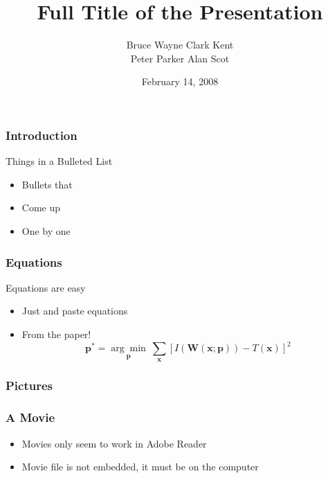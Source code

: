\documentclass[serif,mathserif]{beamer}
\author[Bruce Wayne]{Bruce Wayne \quad Clark Kent\\Peter Parker \quad Alan Scot}
\title[Short Title\hspace{2em}\insertframenumber/\inserttotalframenumber]{Full Title of the Presentation}
\date{February 14, 2008} %
\institute{Justice League of America}
\begin{document}
\maketitle


\begin{frame}
  \frametitle{Introduction}
  Things in a Bulleted List\pause
  \begin{itemize}
  \item Bullets that\pause
  \item Come up\pause
  \item One by one %
  \end{itemize}
\end{frame}


\begin{frame}
  \frametitle{Equations}
  Equations are easy
  \begin{itemize}
  \item Just and paste equations\pause
  \item From the paper!
    \begin{equation*}
      \textbf{p}^* = \underset{\textbf{p}}{\arg\!\min}~\sum_{\textbf{x}}\left[ I(\textbf{W}(\textbf{x};\textbf{p})) - T(\textbf{x}) \right]^2
    \end{equation*}
  \end{itemize}
\end{frame}

\begin{frame}
  \frametitle{Pictures}
  \begin{figure}[t]
    \centering
  \end{figure}
\end{frame}

\begin{frame}
  \frametitle{A Movie}
  \begin{center}
  \end{center}
  \begin{itemize}
  \item Movies only seem to work in Adobe Reader
  \item Movie file is not embedded, it must be on the computer
  \end{itemize}
\end{frame}
\end{document}
